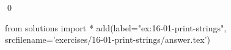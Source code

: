 
\begin{ex}
  \label{ex:16-01-print-strings}
  
  \qed
\end{ex}
\begin{python0}
from solutions import *
add(label="ex:16-01-print-strings",
    srcfilename='exercises/16-01-print-strings/answer.tex')
\end{python0}
